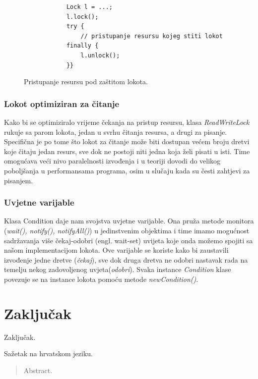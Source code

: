 \documentclass[times, utf8, zavrsni]{fer}
\begin{document}
\begin{figure}[ht!]
\begin{lstlisting}
 			Lock l = ...;
 			l.lock();
 			try {
   				// pristupanje resursu kojeg stiti lokot
		  	finally {
		   		l.unlock();
 			}}
\end{lstlisting}
\caption{Pristupanje resursu pod zaštitom lokota.}
\label{overflow}
\end{figure}

\subsection{Lokot optimiziran za čitanje}
Kako bi se optimiziralo vrijeme čekanja na pristup resursu, klasa \textit{ReadWriteLock} rukuje sa parom lokota, jedan u svrhu čitanja resursa, a drugi za pisanje. Specifična je po tome što lokot za čitanje može biti dostupan većem broju dretvi koje čitaju jedan resurs, sve dok ne postoji niti jedna koja želi pisati u isti.
Time omogućava veći nivo paralelnosti izvođenja i u teoriji dovodi do velikog poboljšanja u performansama programa, osim u slučaju kada su česti zahtjevi za pisanjem.

\subsection{Uvjetne varijable}
Klasa Condition daje nam svojstva uvjetne varijable. Ona pruža metode monitora (\textit{wait(), notify(), notifyAll()}) u jedinstvenim objektima i time imamo mogućnost sadržavanja više čekaj-odobri (engl. wait-set) uvijeta koje onda možemo spojiti sa našom implementacijom lokota. 
Ove varijable se koriste kako bi zaustavili izvođenje jedne dretve (\textit{čekaj}), sve dok druga dretva ne odobri nastavak rada na temelju nekog zadovoljenog uvjeta(\textit{odobri}).
Svaka instance \textit{Condition} klase povezuje se na instance lokota pomoću metode \textit{newCondition()}.

\chapter{Zaključak}
Zaključak.




\begin{sazetak}
Sažetak na hrvatskom jeziku.

\end{sazetak}

\begin{abstract}
Abstract.

\end{abstract}
\end{document}

